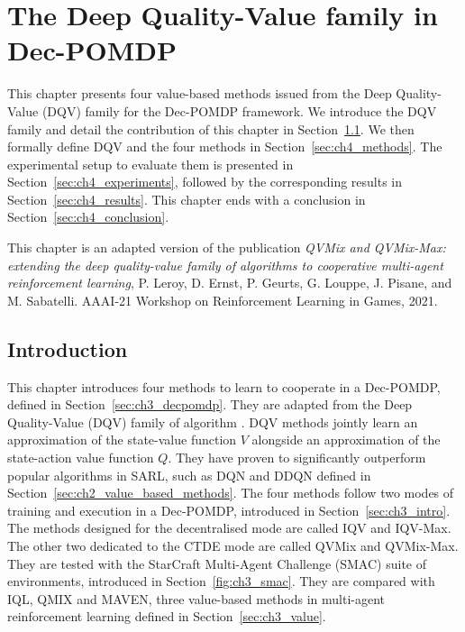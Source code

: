 \chapter{The Deep Quality-Value family in Dec-POMDP}\label{ch:qvmix}
\begin{chapter_outline}

This chapter presents four value-based methods issued from the Deep Quality-Value (DQV) family for the Dec-POMDP framework.
We introduce the DQV family and detail the contribution of this chapter in Section~\ref{sec:ch4_intro}.
We then formally define DQV and the four methods in Section~\ref{sec:ch4_methods}.
The experimental setup to evaluate them is presented in Section~\ref{sec:ch4_experiments}, followed by the corresponding results in Section~\ref{sec:ch4_results}.
This chapter ends with a conclusion in Section~\ref{sec:ch4_conclusion}.

This chapter is an adapted version of the publication \citep{leroy2020qvmix} \textit{QVMix and QVMix-Max: extending the deep quality-value family of algorithms to cooperative multi-agent reinforcement learning}, P. Leroy, D. Ernst, P. Geurts, G. Louppe, J. Pisane, and M. Sabatelli. AAAI-21 Workshop on Reinforcement Learning in Games, 2021.

\end{chapter_outline}


\section{Introduction} \label{sec:ch4_intro}

This chapter introduces four methods to learn to cooperate in a Dec-POMDP, defined in Section~\ref{sec:ch3_decpomdp}.
They are adapted from the Deep Quality-Value (DQV) family of algorithm \citep{sabatelli2020deep}.
DQV methods jointly learn an approximation of the state-value function $V$ alongside an approximation of the state-action value function $Q$.
They have proven to significantly outperform popular algorithms in SARL, such as DQN and DDQN defined in Section~\ref{sec:ch2_value_based_methods}.
The four methods follow two modes of training and execution in a Dec-POMDP, introduced in Section~\ref{sec:ch3_intro}.
The methods designed for the decentralised mode are called IQV and IQV-Max.
The other two dedicated to the CTDE mode are called QVMix and QVMix-Max.
They are tested with the StarCraft Multi-Agent Challenge (SMAC) suite of environments, introduced in Section~\ref{fig:ch3_smac}.
They are compared with IQL, QMIX and MAVEN, three value-based methods in multi-agent reinforcement learning defined in Section~\ref{sec:ch3_value}.

